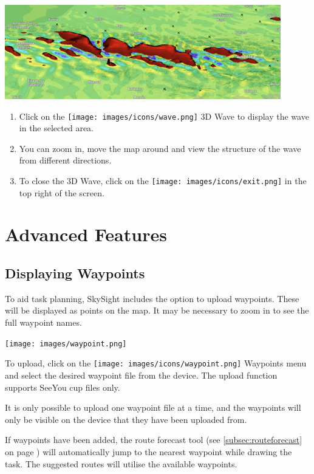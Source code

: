 \documentclass[11pt,a4paper]{article}
\begin{document}
\begin{center}
\includegraphics[width=12cm]{images/3dwave.png}
\end{center}

\begin{enumerate}
\item Click on the \texttt{[image: images/icons/wave.png]} 3D Wave to display the wave in the selected area. 
\item You can zoom in, move the map around and view the structure of the wave from different directions.
\item To close the 3D Wave, click on the \texttt{[image: images/icons/exit.png]} in the top right of the screen. 
\end{enumerate}


\section{Advanced Features}
\subsection{Displaying Waypoints}\label{subsec:waypoints}
To aid task planning, SkySight includes the option to upload waypoints. These will be displayed as points on the map.  It may be necessary to zoom in to see the full waypoint names.
\begin{center}
\texttt{[image: images/waypoint.png]}
\end{center}
To upload, click on the \texttt{[image: images/icons/waypoint.png]} Waypoints menu and select the desired waypoint file from the device. The upload function supports SeeYou cup files only.

It is only possible to upload one waypoint file at a time, and the waypoints will only be visible on the device that they have been uploaded from.
\begin{tip}
\item If waypoints have been added, the route forecast tool (see \ref{subsec:routeforecast} on page \pageref{subsec:routeforecast}) will automatically jump to the nearest waypoint while drawing the task. The suggested routes will utilise the available waypoints. 
\end{tip}
\end{document}
